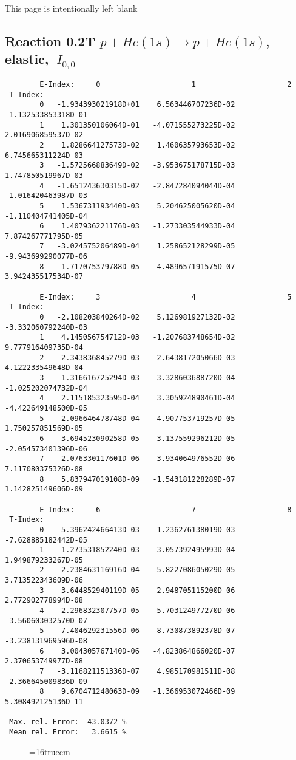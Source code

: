 \documentclass[12pt]{article}
\begin{document}
\newpage
This page is intentionally left blank
\newpage

\subsection{
Reaction 0.2T $ p + He(1s) \rightarrow p + He(1s) ,\  $
elastic, $ \  I_{0,0} $
}

\begin{small}\begin{verbatim}
        E-Index:     0                     1                     2
 T-Index:
        0   -1.934393021918D+01    6.563446707236D-02   -1.132533853318D-01
        1    1.301350106064D-01   -4.071555273225D-02    2.016906859537D-02
        2    1.828664127573D-02    1.460635793653D-02    6.745665311224D-03
        3   -1.572566883649D-02   -3.953675178715D-03    1.747850519967D-03
        4   -1.651243630315D-02   -2.847284094044D-04   -1.016420463987D-03
        5    1.536731193440D-03    5.204625005620D-04   -1.110404741405D-04
        6    1.407936221176D-03   -1.273303544933D-04    7.874267771795D-05
        7   -3.024575206489D-04    1.258652128299D-05   -9.943699290077D-06
        8    1.717075379788D-05   -4.489657191575D-07    3.942435517534D-07

        E-Index:     3                     4                     5
 T-Index:
        0   -2.108203840264D-02    5.126981927132D-02   -3.332060792240D-03
        1    4.145056754712D-03   -1.207683748654D-02    9.777916409735D-04
        2   -2.343836845279D-03   -2.643817205066D-03    4.122233549648D-04
        3    1.316616725294D-03   -3.328603688720D-04   -1.025202074732D-04
        4    2.115185323595D-04    3.305924890461D-04   -4.422649148500D-05
        5   -2.096646478748D-04    4.907753719257D-05    1.750257851569D-05
        6    3.694523090258D-05   -3.137559296212D-05   -2.054573401396D-06
        7   -2.076330117601D-06    3.934064976552D-06    7.117080375326D-08
        8    5.837947019108D-09   -1.543181228289D-07    1.142825149606D-09

        E-Index:     6                     7                     8
 T-Index:
        0   -5.396242466413D-03    1.236276138019D-03   -7.628885182442D-05
        1    1.273531852240D-03   -3.057392495993D-04    1.949879233267D-05
        2    2.238463116916D-04   -5.822708605029D-05    3.713522343609D-06
        3    3.644852940119D-05   -2.948705115200D-06    2.772902778994D-08
        4   -2.296832307757D-05    5.703124977270D-06   -3.560603032570D-07
        5   -7.404629231556D-06    8.730873892378D-07   -3.238131969596D-08
        6    3.004305767140D-06   -4.823864866020D-07    2.370653749977D-08
        7   -3.116821151336D-07    4.985170981511D-08   -2.366645009836D-09
        8    9.670471248063D-09   -1.366953072466D-09    5.308492125136D-11

 Max. rel. Error:  43.0372 %
 Mean rel. Error:   3.6615 %

\end{verbatim}\end{small}
\begin{figure} \label{0.2T}
\epsfxsize=16truecm
\end{figure}
\newpage
\end{document}
